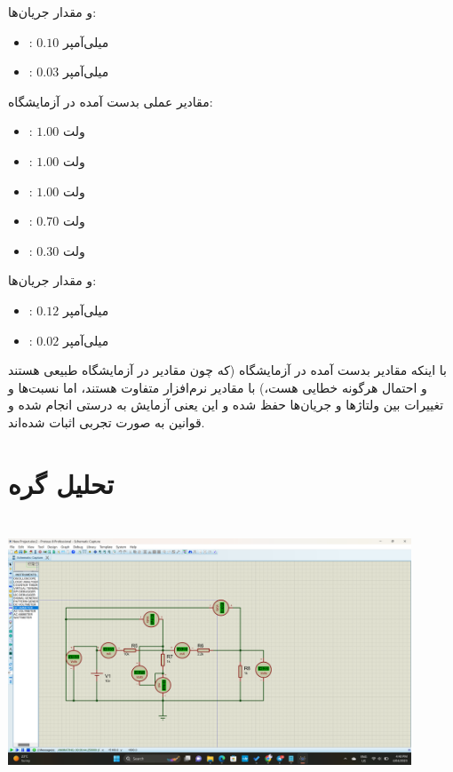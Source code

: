 \documentclass{article}
\begin{document}
		و مقدار جریان‌ها:
		\begin{itemize}
			\item {}: $0.10$ میلی‌آمپر
			\item {}: $0.03$ میلی‌آمپر
		\end{itemize}
	
		مقادیر عملی بدست آمده در آزمایشگاه:
		\begin{itemize}
			\item {}: $1.00$ ولت
			\item {}: $1.00$ ولت 
			\item {}: $1.00$ ولت
			\item {}: $0.70$ ولت
			\item {}: $0.30$ ولت
		\end{itemize}
		
		و مقدار جریان‌ها:
		\begin{itemize}
			\item {}: $0.12$ میلی‌آمپر
			\item {}: $0.02$ میلی‌آمپر
		\end{itemize}
			با اینکه مقادیر بدست آمده در آزمایشگاه (که چون مقادیر در آزمایشگاه طبیعی هستند و احتمال هرگونه‌ خطایی هست،) با مقادیر نرم‌افزار متفاوت هستند، اما نسبت‌ها و تغییرات بین ولتاژها و جریان‌ها حفظ شده و این یعنی آزمایش به درستی انجام شده و قوانین به صورت تجربی اثبات شده‌اند.
			
	\clearpage
	\section{تحلیل گره}
		\begin{center}
			\includegraphics[width=12cm, height=8cm]{./images/2}
		\end{center}
		
\end{document}
